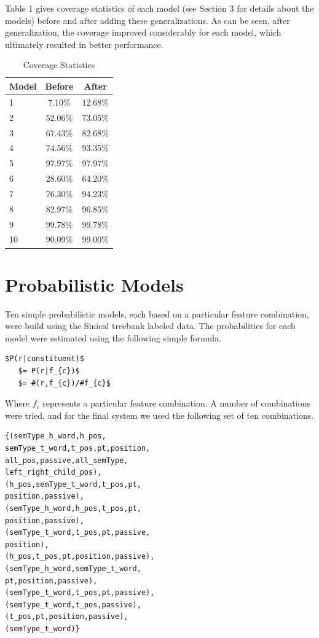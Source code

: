 Table 1 gives coverage statistics of each model (see Section 3 for details about the models) before and after adding these generalizations. As can be seen, after generalization, the coverage improved considerably for each model, which ultimately resulted in better performance.
\begin{table}[!h]
\begin{center}
\begin{tabular}{|p{1cm}|c|c|}
\hline \bf Model & \bf Before & \bf After \\ \hline
 1 & 7.10\% & 12.68\%  \\ 
 2 & 52.06\% & 73.05\%   \\ 
 3 & 67.43\% &  82.68\%   \\ 
 4 & 74.56\% &  93.35\%  \\ 
 5 & 97.97\% & 97.97\%   \\ 
 6 & 28.60\% &  64.20\%   \\ 
 7 & 76.30\% & 94.23\%   \\ 
 8 & 82.97\% & 96.85\%   \\ 
 9 & 99.78\% & 99.78\%   \\ 
 10 & 90.09\% & 99.00\%   \\ 
\hline 
\end{tabular}  
\caption{Coverage Statistics}
\end{center}
\end{table}
\section{Probabilistic Models}
Ten simple probabilistic models, each based on a particular feature combination, were build using the Sinical treebank labeled data. The probabilities for each model were estimated using the following simple formula. 
\begin{Verbatim}[commandchars=\\\{\},codes={\catcode`$=3\catcode`_=8}]
  $P(r|constituent)$  
   $= P(r|f_{c})$
   $= #(r,f_{c})/#f_{c}$
\end{Verbatim} 
Where $f_c$ represents a particular feature combination. A number of combinations were tried, and for the final system we used the following set of ten combinations.
\begin{verbatim}
{(semType_h_word,h_pos,
semType_t_word,t_pos,pt,position,
all_pos,passive,all_semType,
left_right_child_pos), 
(h_pos,semType_t_word,t_pos,pt,
position,passive),
(semType_h_word,h_pos,t_pos,pt,
position,passive),
(semType_t_word,t_pos,pt,passive,
position),
(h_pos,t_pos,pt,position,passive),
(semType_h_word,semType_t_word,
pt,position,passive),
(semType_t_word,t_pos,pt,passive),
(semType_t_word,t_pos,passive),
(t_pos,pt,position,passive),
(semType_t_word)}
\end{verbatim}

